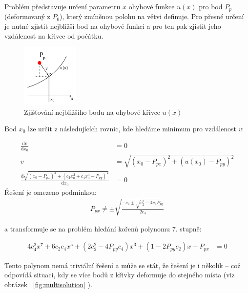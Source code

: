 Problém představuje určení parametru $x$ ohybové funkce $u(x)$ pro bod $P_p$ (deformovaný z $P_0$), který zmíněnou polohu na větvi definuje. Pro přesné určení je nutné zjistit nejbližší bod na ohybové funkci a pro ten pak zjistit jeho vzdálenost na křivce od počátku. 
\begin{figure}[!hbt]
\begin{center}
\includegraphics[width=0.25\textwidth]{./figures/revDef_dist.png}
\caption[Zjišťování nejbližšího bodu na ohybové křivce]%
{Zjišťování nejbližšího bodu na ohybové křivce $u(x)$\label{fig:closestPointOnCurve}}
\end{center}
\end{figure}

Bod $x_0$ lze určit z následujících rovnic, kde hledáme minimum pro vzdálenost $v$:

\begin{align}
\frac{\mathrm {d}{v}}{\mathrm {d}{x_0}} &= 0 \nonumber\\
v &= \sqrt{(x_0 - P_{px})^2 + (u(x_0) - P_{py})^2} \nonumber\\
\frac{\mathrm {d} \sqrt{(x_0 - P_{px})^2 + (c_2x_0^2 +c_4x_0^4 - P_{py})^2}}{\mathrm{d}x_0} &=0
\end{align}
Řešení je omezeno podmínkou:
\begin{align}
P_{px} \neq \pm \sqrt {\frac{-c_2 \pm \sqrt{c_2^2 - 4c_4P_{py}}}{2c_4}}
\end{align}

a transformuje se na problém hledání kořenů polynomu 7. stupně:

\begin{align}
\label{closestPointEq}
4c_4^2 x^7 + 6c_2c_4x^5 + (2c_2^2 - 4P_{py}c_4)x^3 + (1-2P_{py}c_2)x - P_{px} &= 0
\end{align}

Tento polynom nemá triviální řešení a může se stát, že řešení je i několik – což odpovídá situaci, kdy se více bodů z křivky deformuje do stejného místa (viz obrázek ~\ref{fig:multisolution} ).


